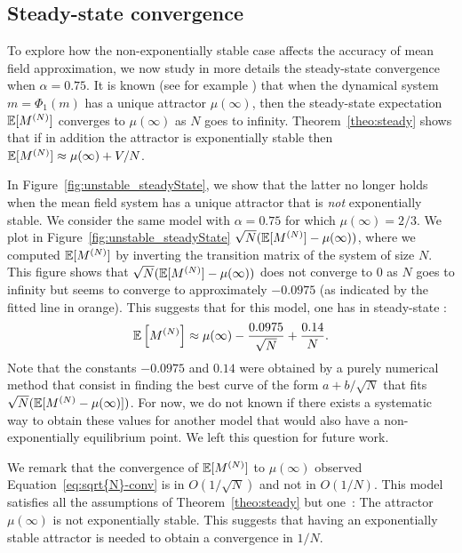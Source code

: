\documentclass{amsart}
\begin{document}
\subsection{Steady-state convergence}

To explore how the non-exponentially stable case affects the accuracy
of mean field approximation, we now study in more details the
steady-state convergence when $\alpha=0.75$. It is known (see for
example \cite[Corollary~14]{gastgaujalDEDS}) that when the dynamical
system $m=\Phi_1(m)$ has a unique attractor $\mu(\infty)$, then the
steady-state expectation $\esp{\MN}$ converges to $\mu(\infty)$ as $N$
goes to infinity. Theorem~\ref{theo:steady} shows that if in addition
the attractor is exponentially stable then
$\esp{\MN}\approx \mu(\infty)+V/N$.

In Figure~\ref{fig:unstable_steadyState}, we show that the latter no longer
holds when the mean field system has a unique attractor that is {\em not}
exponentially stable. We consider the same model with $\alpha=0.75$
for which $\mu(\infty)=2/3$. We plot in
Figure~\ref{fig:unstable_steadyState}
$\sqrt{N}(\esp{\MN}-\mu(\infty))$, where we computed $\esp{\MN}$ by
inverting the transition matrix of the system of size $N$. This figure
shows that $\sqrt{N}(\esp{\MN}-\mu(\infty))$ does not converge to $0$
as $N$ goes to infinity but seems to converge to approximately
$-0.0975$ (as indicated by the fitted line in orange). This suggests
that for this model, one has in steady-state :
\begin{align}
  \esp{\MN}\approx\mu(\infty)-\frac{0.0975}{\sqrt{N}}+\frac{0.14}{N}.
  \label{eq:sqrt{N}-conv}
\end{align}
Note that the constants $-0.0975$ and $0.14$ were obtained by a purely
numerical method that consist in finding the best curve of the form
$a+b/\sqrt{N}$ that fits $\sqrt{N}(\esp{\MN-\mu(\infty)})$. For now,
we do not known if there exists a systematic way to obtain these
values for another model that would also have a non-exponentially
equilibrium point. We left this question for future work. 


We remark that the convergence of $\esp{\MN}$ to $\mu(\infty)$
observed Equation~\eqref{eq:sqrt{N}-conv} is in $O(1/\sqrt{N})$ and
not in $O(1/N)$. This model satisfies all the assumptions of
Theorem~\ref{theo:steady} but one~: The attractor $\mu(\infty)$ is not
exponentially stable. This suggests that having an exponentially
stable attractor is needed to obtain a convergence in $1/N$.  
\end{document}
